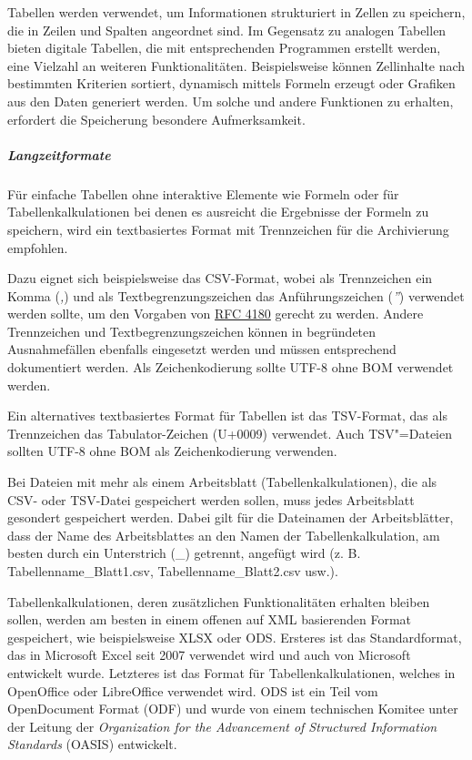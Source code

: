 Tabellen werden verwendet, um Informationen strukturiert in Zellen zu speichern, die in Zeilen und Spalten angeordnet sind. Im Gegensatz zu analogen Tabellen bieten digitale Tabellen, die mit entsprechenden Programmen erstellt werden, eine Vielzahl an weiteren Funktionalitäten. Beispielsweise können Zellinhalte nach bestimmten Kriterien sortiert, dynamisch mittels Formeln erzeugt oder Grafiken aus den Daten generiert werden. Um solche und andere Funktionen zu erhalten, erfordert die Speicherung besondere Aufmerksamkeit.


\subparagraph{Langzeitformate} Für einfache Tabellen ohne interaktive Elemente wie Formeln oder für Tabellenkalkulationen bei denen es ausreicht die Ergebnisse der Formeln zu speichern, wird ein textbasiertes Format mit Trennzeichen für die Archivierung empfohlen. 

Dazu eignet sich beispielsweise das CSV-Format, wobei als Trennzeichen ein Komma (\emph{,}) und als Textbegrenzungszeichen das Anführungszeichen (\emph{''}) verwendet werden sollte, um den Vorgaben von \href{https://tools.ietf.org/html/rfc4180}{RFC 4180} gerecht zu werden. Andere Trennzeichen und Textbegrenzungszeichen können in begründeten Ausnahmefällen ebenfalls eingesetzt werden und müssen entsprechend dokumentiert werden. Als Zeichenkodierung sollte UTF-8 ohne BOM verwendet werden.

Ein alternatives textbasiertes Format für Tabellen ist das TSV-Format, das als Trennzeichen das Tabulator-Zeichen (U+0009) verwendet. Auch TSV"=Dateien sollten UTF-8 ohne BOM als Zeichenkodierung verwenden.

Bei Dateien mit mehr als einem Arbeitsblatt (Tabellenkalkulationen), die als CSV- oder TSV-Datei gespeichert werden sollen, muss jedes Arbeitsblatt gesondert gespeichert werden. Dabei gilt für die Dateinamen der Arbeitsblätter, dass der Name des Arbeitsblattes an den Namen der Tabellenkalkulation, am besten durch ein Unterstrich ({\_}) getrennt, angefügt wird (z. B. Tabellenname{\_}Blatt1.csv, Tabellenname{\_}Blatt2.csv usw.).

Tabellenkalkulationen, deren zusätzlichen Funktionalitäten erhalten bleiben sollen, werden am besten in einem offenen auf XML basierenden Format gespeichert, wie beispielsweise XLSX oder ODS. Ersteres ist das Standardformat, das in Microsoft Excel seit 2007 verwendet wird und auch von Microsoft entwickelt wurde. Letzteres ist das Format für Tabellenkalkulationen, welches in OpenOffice oder LibreOffice verwendet wird. ODS ist ein Teil vom OpenDocument Format (ODF) und wurde von einem technischen Komitee unter der Leitung der \emph{Organization for the Advancement of Structured Information Standards} (OASIS) entwickelt.

